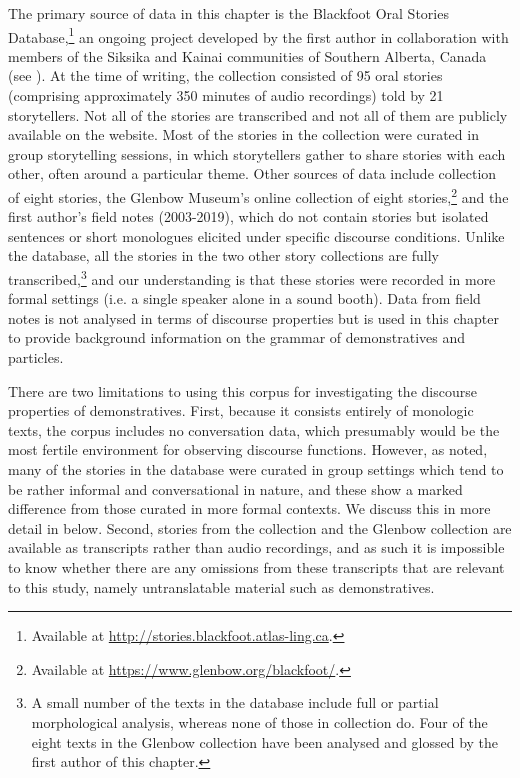\documentclass[output=paper,colorlinks,citecolor=brown]{langscibook}
\begin{document}
The primary source of data in this chapter is the Blackfoot Oral Stories Database,\footnote{Available at \url{http://stories.blackfoot.atlas-ling.ca}.} an ongoing project developed by the first author in collaboration with members of the Siksika and Kainai communities of Southern Alberta, Canada (see \citealt{BlissEtAl2019}). At the time of writing, the collection consisted of 95 oral stories (comprising approximately 350 minutes of audio recordings) told by 21 storytellers. Not all of the stories are transcribed and not all of them are publicly available on the website. Most of the stories in the collection were curated in group storytelling sessions, in which storytellers gather to share stories with each other, often around a particular theme. Other sources of data include  collection of eight stories, the Glenbow Museum’s online collection of eight stories,\footnote{Available at \url{https://www.glenbow.org/blackfoot/}.} and the first author’s field notes (2003-2019), which do not contain stories but isolated sentences or short monologues elicited under specific discourse conditions. Unlike the database, all the stories in the two other story collections are fully transcribed,\footnote{A small number of the texts in the database include full or partial morphological analysis, whereas none of those in \citeauthor{RussellGenee2014} collection do. Four of the eight texts in the Glenbow collection have been analysed and glossed by the first author of this chapter.} and our understanding is that these stories were recorded in more formal settings (i.e. a single speaker alone in a sound booth). Data from field notes is not analysed in terms of discourse properties but is used in this chapter to provide background information on the grammar of demonstratives and particles.

There are two limitations to using this corpus for investigating the discourse properties of demonstratives. First, because it consists entirely of monologic texts, the corpus includes no conversation data, which presumably would be the most fertile environment for observing discourse functions. However, as noted, many of the stories in the database were curated in group settings which tend to be rather informal and conversational in nature, and these show a marked difference from those curated in more formal contexts. We discuss this in more detail in  below. Second, stories from the \citet{RussellGenee2014} collection and the Glenbow collection are available as transcripts rather than audio recordings, and as such it is impossible to know whether there are any omissions from these transcripts that are relevant to this study, namely untranslatable material such as demonstratives.
\end{document}
